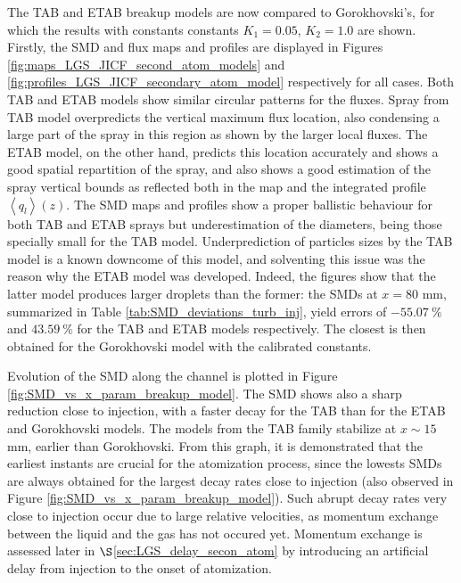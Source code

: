 The TAB and ETAB breakup models are now compared to Gorokhovski's, for which the results with constants constants $K_1 = 0.05$, $K_2 = 1.0$ are shown. Firstly, the SMD and flux maps and profiles are displayed in Figures \ref{fig:maps_LGS_JICF_second_atom_models} and \ref{fig:profiles_LGS_JICF_secondary_atom_model} respectively for all cases. Both TAB and ETAB models show similar circular patterns for the fluxes. Spray from TAB model overpredicts the vertical maximum flux location, also condensing a large part of the spray in this region as shown by the larger local fluxes. The ETAB model, on the other hand, predicts this location accurately and shows a good spatial repartition of the spray, and also shows a good estimation of the spray vertical bounds as reflected both in the map and the integrated profile $\left\langle q_l \right\rangle \left( z \right)$. The SMD maps and profiles show a proper ballistic behaviour for both TAB and ETAB sprays but underestimation of the diameters, being those specially small for the TAB model. Underprediction of particles sizes by the TAB model is a known downcome of this model, and solventing this issue was the reason why the ETAB model was developed. Indeed, the figures show that the latter model produces larger droplets than the former: the SMDs at $x = 80$ mm, summarized in Table \ref{tab:SMD_deviations_turb_inj}, yield errors of $- 55.07~\%$ and $43.59~\%$ for the TAB and ETAB models respectively. The closest is then obtained for the Gorokhovski model with the calibrated constants. 

Evolution of the SMD along the channel is plotted in Figure \ref{fig:SMD_vs_x_param_breakup_model}. The SMD shows also a sharp reduction close to injection, with a faster decay for the TAB than for the ETAB and Gorokhovski models. The models from the TAB family stabilize at $x \sim 15$ mm, earlier than Gorokhovski. From this graph, it is demonstrated that the earliest instants are crucial for the atomization process, since the lowests SMDs are always obtained for the largest decay rates close to injection (also observed in Figure \ref{fig:SMD_vs_x_param_breakup_model}). Such abrupt decay rates very close to injection occur due to large relative velocities, as momentum exchange between the liquid and the gas has not occured yet. Momentum exchange is assessed later in $\S$\ref{sec:LGS_delay_secon_atom} by introducing an artificial delay from injection to the onset of atomization.

